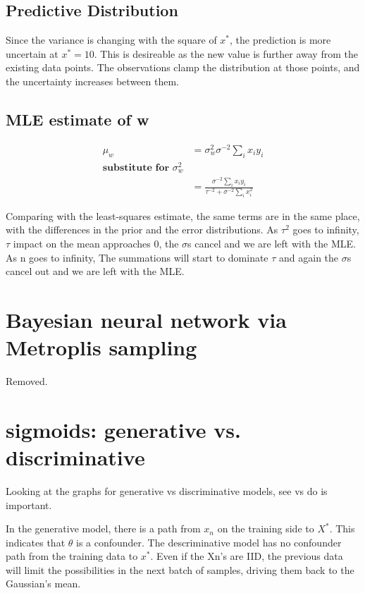 \documentclass[11pt]{article}
\begin{document}
\subsection{Predictive Distribution}

Since the variance is changing with the square of $x^*$, the prediction is more uncertain at $x^* = 10$. This is desireable as the new value is further away from the existing data points. The observations clamp the distribution at those points, and the uncertainty increases between them.

\subsection{MLE estimate of w}

\begin{align}
	\mu_w &= \sigma_w^2 \sigma^{-2} \sum_{i} x_iy_i \\
\textbf{substitute for $\sigma_w^2$} \\
	      &= \frac{\sigma^{-2} \sum_{i} x_iy_i}{\tau^{-2} + \sigma^{-2} \sum_{i} x_i^2}
\end{align}

Comparing with the least-squares estimate, the same terms are in the same place, with the differences in the prior and the error distributions. As $\tau^2$ goes to infinity, $\tau$ impact on the mean approaches 0, the $\sigma$s cancel and we are left with the MLE. As n goes to infinity, The summations will start to dominate $\tau$ and again the $\sigma$s cancel out and we are left with the MLE.


\section{Bayesian neural network via Metroplis sampling}

Removed.

\section{sigmoids: generative vs. discriminative}

Looking at the graphs for generative vs discriminative models, see vs do is important.

In the generative model, there is a path from $x_n$ on the training side to $X^*$. This indicates that $\theta$ is a confounder. The descriminative model has no confounder path from the training data to $x^*$. Even if the Xn's are IID, the previous data will limit the possibilities in the next batch of samples, driving them back to the Gaussian's mean.
\end{document}
